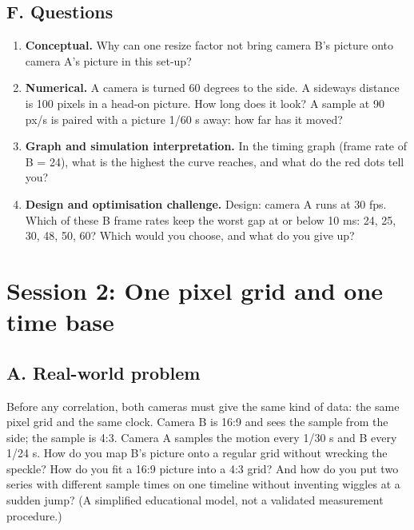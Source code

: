 \documentclass[11pt,a4paper]{article}
\begin{document}
\subsection*{F. Questions}
\begin{enumerate}[nosep]
\item \textbf{Conceptual.} Why can one resize factor not bring camera B's picture onto camera A's picture in this set-up?
\item \textbf{Numerical.} A camera is turned 60 degrees to the side. A sideways distance is 100 pixels in a head-on picture. How long does it look? A sample at 90 px/s is paired with a picture 1/60 s away: how far has it moved?
\item \textbf{Graph and simulation interpretation.} In the timing graph (frame rate of B = 24), what is the highest the curve reaches, and what do the red dots tell you?
\item \textbf{Design and optimisation challenge.} Design: camera A runs at 30 fps. Which of these B frame rates keep the worst gap at or below 10 ms: 24, 25, 30, 48, 50, 60? Which would you choose, and what do you give up?
\end{enumerate}

\section{Session 2: One pixel grid and one time base}

\subsection*{A. Real-world problem}
Before any correlation, both cameras must give the same kind of data: the same pixel grid and the same clock. Camera B is 16:9 and sees the sample from the side; the sample is 4:3. Camera A samples the motion every 1/30 s and B every 1/24 s. How do you map B's picture onto a regular grid without wrecking the speckle? How do you fit a 16:9 picture into a 4:3 grid? And how do you put two series with different sample times on one timeline without inventing wiggles at a sudden jump? (A simplified educational model, not a validated measurement procedure.)
\end{document}
